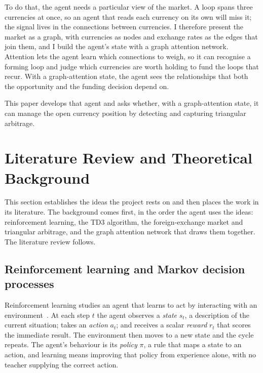 \documentclass[12pt,a4paper]{article}
\begin{document}
To do that, the agent needs a particular view of the market. A loop spans three currencies at
once, so an agent that reads each currency on its own will miss it; the signal lives in the
connections between currencies. I therefore present the market as a graph, with currencies as
nodes and exchange rates as the edges that join them, and I build the agent's state with a
graph attention network. Attention lets the agent learn which connections to weigh, so it can
recognise a forming loop and judge which currencies are worth holding to fund the loops that
recur. With a graph-attention state, the agent sees the relationships that both the
opportunity and the funding decision depend on.

This paper develops that agent and asks whether, with a graph-attention state, it can manage
the open currency position by detecting and capturing triangular arbitrage.

\section{Literature Review and Theoretical Background}
\label{sec:lit}

This section establishes the ideas the project rests on and then places the work in its
literature. The background comes first, in the order the agent uses the ideas: reinforcement
learning, the TD3 algorithm, the foreign-exchange market and triangular arbitrage, and the
graph attention network that draws them together. The literature review follows.

\subsection{Reinforcement learning and Markov decision processes}

Reinforcement learning studies an agent that learns to act by interacting with an
environment~\citep{sutton2018}. At each step $t$ the agent observes a \emph{state} $s_t$, a
description of the current situation; takes an \emph{action} $a_t$; and receives a scalar
\emph{reward} $r_t$ that scores the immediate result. The environment then moves to a new
state and the cycle repeats. The agent's behaviour is its \emph{policy} $\pi$, a rule that
maps a state to an action, and learning means improving that policy from experience alone,
with no teacher supplying the correct action.
\end{document}
